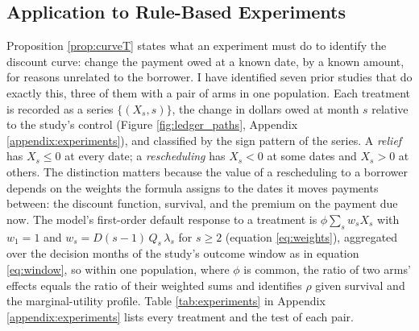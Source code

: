 \subsection{Application to Rule-Based Experiments}\label{sec:quasi}

Proposition \ref{prop:curveT} states what an experiment must do to identify the discount curve: change the payment owed at a known date, by a known amount, for reasons unrelated to the borrower. I have identified seven prior studies that do exactly this, three of them with a pair of arms in one population. Each treatment is recorded as a series $\{(X_s, s)\}$, the change in dollars owed at month $s$ relative to the study's control (Figure \ref{fig:ledger_paths}, Appendix \ref{appendix:experiments}), and classified by the sign pattern of the series. A \emph{relief} has $X_s \le 0$ at every date; a \emph{rescheduling} has $X_s < 0$ at some dates and $X_s > 0$ at others. The distinction matters because the value of a rescheduling to a borrower depends on the weights the formula assigns to the dates it moves payments between: the discount function, survival, and the premium on the payment due now. The model's first-order default response to a treatment is $\phi \sum_s w_s X_s$ with $w_1 = 1$ and $w_s = D(s-1)\,Q_s\,\lambda_s$ for $s \ge 2$ (equation \eqref{eq:weights}), aggregated over the decision months of the study's outcome window as in equation \eqref{eq:window}, so within one population, where $\phi$ is common, the ratio of two arms' effects equals the ratio of their weighted sums and identifies $\rho$ given survival and the marginal-utility profile. Table \ref{tab:experiments} in Appendix \ref{appendix:experiments} lists every treatment and the test of each pair.

